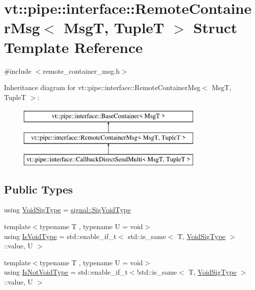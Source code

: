 \hypertarget{structvt_1_1pipe_1_1interface_1_1_remote_container_msg}{}\section{vt\+:\+:pipe\+:\+:interface\+:\+:Remote\+Container\+Msg$<$ MsgT, TupleT $>$ Struct Template Reference}
\label{structvt_1_1pipe_1_1interface_1_1_remote_container_msg}


{\ttfamily \#include $<$remote\+\_\+container\+\_\+msg.\+h$>$}

Inheritance diagram for vt\+:\+:pipe\+:\+:interface\+:\+:Remote\+Container\+Msg$<$ MsgT, TupleT $>$\+:\begin{figure}[H]
\begin{center}
\leavevmode
\includegraphics[height=3.000000cm]{structvt_1_1pipe_1_1interface_1_1_remote_container_msg}
\end{center}
\end{figure}
\subsection*{Public Types}
\begin{DoxyCompactItemize}
\item 
using \hyperlink{structvt_1_1pipe_1_1interface_1_1_remote_container_msg_ae2139dd54fd8fb4bf561241bf03b56ec}{Void\+Sig\+Type} = \hyperlink{namespacevt_1_1pipe_1_1signal_acbe257d1ae44f20fa9fd9b6ed3057caf}{signal\+::\+Sig\+Void\+Type}
\item 
{\footnotesize template$<$typename T , typename U  = void$>$ }\\using \hyperlink{structvt_1_1pipe_1_1interface_1_1_remote_container_msg_af3f6ea130372986d8d0b4c39f35f59b6}{Is\+Void\+Type} = std\+::enable\+\_\+if\+\_\+t$<$ std\+::is\+\_\+same$<$ T, \hyperlink{structvt_1_1pipe_1_1interface_1_1_remote_container_msg_ae2139dd54fd8fb4bf561241bf03b56ec}{Void\+Sig\+Type} $>$\+::value, U $>$
\item 
{\footnotesize template$<$typename T , typename U  = void$>$ }\\using \hyperlink{structvt_1_1pipe_1_1interface_1_1_remote_container_msg_ab12f66d491cc0783269a302390f76a1d}{Is\+Not\+Void\+Type} = std\+::enable\+\_\+if\+\_\+t$<$!std\+::is\+\_\+same$<$ T, \hyperlink{structvt_1_1pipe_1_1interface_1_1_remote_container_msg_ae2139dd54fd8fb4bf561241bf03b56ec}{Void\+Sig\+Type} $>$\+::value, U $>$
\end{DoxyCompactItemize}
